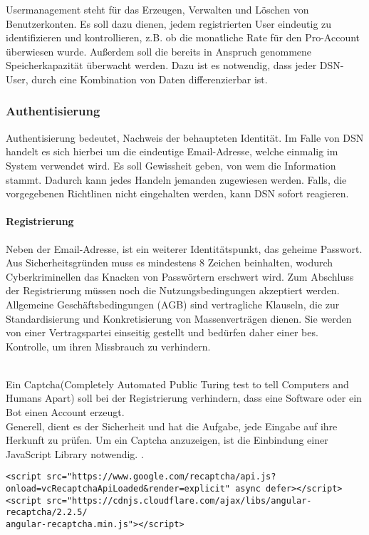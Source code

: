 
Usermanagement steht für das Erzeugen, Verwalten und Löschen von Benutzerkonten. Es soll dazu dienen, jedem registrierten User eindeutig zu identifizieren und kontrollieren, z.B. ob die monatliche Rate für den Pro-Account überwiesen wurde. Außerdem soll die bereits in Anspruch genommene Speicherkapazität überwacht werden. Dazu ist es notwendig, dass jeder DSN-User, durch eine Kombination von Daten differenzierbar ist.
\subsubsection{Authentisierung}
Authentisierung bedeutet, Nachweis der behaupteten Identität. Im Falle von DSN handelt es sich hierbei um die eindeutige Email-Adresse, welche einmalig im System verwendet wird. Es soll Gewissheit geben, von wem die Information stammt. Dadurch kann jedes Handeln jemanden zugewiesen werden. Falls, die vorgegebenen Richtlinen nicht eingehalten werden, kann DSN sofort reagieren.
\paragraph{Registrierung}
Neben der Email-Adresse, ist ein weiterer Identitätspunkt, das geheime Passwort. Aus Sicherheitsgründen muss es mindestens 8 Zeichen beinhalten, wodurch Cyberkriminellen das Knacken von Passwörtern erschwert wird. Zum Abschluss der Registrierung müssen noch die Nutzungsbedingungen akzeptiert werden.\\
\grqq{}Allgemeine Geschäftsbedingungen (AGB) sind vertragliche Klauseln, die zur Standardisierung und Konkretisierung von Massenverträgen dienen. Sie werden von einer Vertragspartei einseitig gestellt und bedürfen daher einer bes. Kontrolle, um ihren Missbrauch zu verhindern.\grqq{}\cite{AGB}\\
\cite{VERTEILTE_SYSTEME}\cite{PASSWORT_SCHUTZ}\\


Ein Captcha(Completely Automated Public Turing test to tell Computers and Humans Apart) soll bei der Registrierung verhindern, dass eine Software oder ein Bot einen Account erzeugt.\\
Generell, dient es der Sicherheit und hat die Aufgabe, jede Eingabe auf ihre Herkunft zu prüfen. Um ein Captcha anzuzeigen, ist die Einbindung einer JavaScript Library notwendig. \cite{CAPTCHA}.
\begin{lstlisting}[caption={Einbindung der JS-Library Recaptcha}]
<script src="https://www.google.com/recaptcha/api.js?
onload=vcRecaptchaApiLoaded&render=explicit" async defer></script>
<script src="https://cdnjs.cloudflare.com/ajax/libs/angular-recaptcha/2.2.5/
angular-recaptcha.min.js"></script>
\end{lstlisting}

